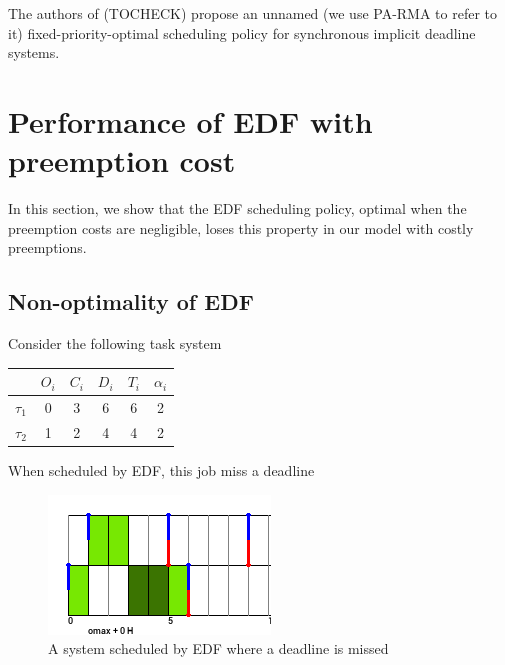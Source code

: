 \documentclass[a4paper,10pt]{article}
\begin{document}
        The authors of \cite{meumeu2007extending} (TOCHECK) propose an unnamed (we use PA-RMA to refer to it) fixed-priority-optimal scheduling policy for synchronous implicit deadline systems.

\section{Performance of EDF with preemption cost}

    In this section, we show that the EDF scheduling policy, optimal when the preemption costs are negligible, loses this property in our model with costly preemptions.

    \subsection{Non-optimality of EDF}

        Consider the following task system

        \begin{center}
            \begin{tabular}{|r|c|c|c|c|c|}
                \hline
                            & $O_i$ & $C_i$ & $D_i$ & $T_i$ & $\alpha_i$ \\ \hline
                $\tau_1$    & 0     & 3     & 6    & 6     & 2     \\ \hline
                $\tau_2$    & 1     & 2     & 4    & 4     & 2     \\ \hline
            \end{tabular}
        \end{center}

        When scheduled by EDF, this job miss a deadline\\

        \begin{figure}[H]
        \begin{center}
            \includegraphics{figs/edfNonOptimal_EDF.png}
            \caption{A system scheduled by EDF where a deadline is missed}
            \label{fig:edfnonoptimal_edf}
        \end{center}
        \end{figure}
\end{document}
